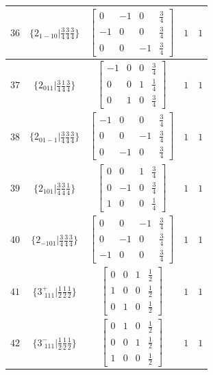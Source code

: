 \documentclass[fleqn,8pt]{jsarticle}
\begin{document}
\begin{longtable}{ccccc}
$ 36 $ & $ \{2{}_{1-10}|\frac{3}{4} \frac{3}{4} \frac{3}{4}\} $ & $ \begin{bmatrix} 0 & -1 & 0 & \frac{3}{4} \\ -1 & 0 & 0 & \frac{3}{4} \\ 0 & 0 & -1 & \frac{3}{4} \end{bmatrix} $ & $ 1 $ & $ 1 $ \\ \hline
$ 37 $ & $ \{2{}_{011}|\frac{3}{4} \frac{1}{4} \frac{3}{4}\} $ & $ \begin{bmatrix} -1 & 0 & 0 & \frac{3}{4} \\ 0 & 0 & 1 & \frac{1}{4} \\ 0 & 1 & 0 & \frac{3}{4} \end{bmatrix} $ & $ 1 $ & $ 1 $ \\ \hline
$ 38 $ & $ \{2{}_{01-1}|\frac{3}{4} \frac{3}{4} \frac{3}{4}\} $ & $ \begin{bmatrix} -1 & 0 & 0 & \frac{3}{4} \\ 0 & 0 & -1 & \frac{3}{4} \\ 0 & -1 & 0 & \frac{3}{4} \end{bmatrix} $ & $ 1 $ & $ 1 $ \\ \hline
$ 39 $ & $ \{2{}_{101}|\frac{3}{4} \frac{3}{4} \frac{1}{4}\} $ & $ \begin{bmatrix} 0 & 0 & 1 & \frac{3}{4} \\ 0 & -1 & 0 & \frac{3}{4} \\ 1 & 0 & 0 & \frac{1}{4} \end{bmatrix} $ & $ 1 $ & $ 1 $ \\ \hline
$ 40 $ & $ \{2{}_{-101}|\frac{3}{4} \frac{3}{4} \frac{3}{4}\} $ & $ \begin{bmatrix} 0 & 0 & -1 & \frac{3}{4} \\ 0 & -1 & 0 & \frac{3}{4} \\ -1 & 0 & 0 & \frac{3}{4} \end{bmatrix} $ & $ 1 $ & $ 1 $ \\ \hline
$ 41 $ & $ \{3^{+}_{\,\,111}|\frac{1}{2} \frac{1}{2} \frac{1}{2}\} $ & $ \begin{bmatrix} 0 & 0 & 1 & \frac{1}{2} \\ 1 & 0 & 0 & \frac{1}{2} \\ 0 & 1 & 0 & \frac{1}{2} \end{bmatrix} $ & $ 1 $ & $ 1 $ \\ \hline
$ 42 $ & $ \{3^{-}_{\,\,111}|\frac{1}{2} \frac{1}{2} \frac{1}{2}\} $ & $ \begin{bmatrix} 0 & 1 & 0 & \frac{1}{2} \\ 0 & 0 & 1 & \frac{1}{2} \\ 1 & 0 & 0 & \frac{1}{2} \end{bmatrix} $ & $ 1 $ & $ 1 $ \\ \hline

\end{longtable}
\end{document}

